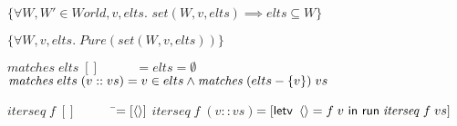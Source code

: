 \documentclass[preprint,natbib]{sigplanconf}
\begin{document}
{\begin{specification}
$\{\forall W, W' \in World, v, elts.$ \nextline
\>$set(W, v, elts) \implies elts \subseteq W\}$ \specand \nextline[0.5em]

$\{\forall W, v, elts.\; \mathit{Pure}(set(W,v,elts))\}$ \nextline[0.5em]
  

$\mathit{matches}\;elts\;[] \qquad\;\;\; = elts = \emptyset$ \nextline
$\mathit{matches}\;elts\;(v :: vs) = v \in elts \land \mathit{matches}\;(elts - \{{v}\})\;vs$ \nextline[0.5em]

$\mathit{iterseq}\; f\; [] \qquad\;\;\;\;$\=$= [\left<\right>]$ \nextline
$\mathit{iterseq}\; f\; (v :: vs)$\>$= [\mbox{\textsf{{letv }}}\left<\right> = f\;v\mbox{\textsf{{ in }}}\mbox{\textsf{{run}}}\;\mathit{iterseq}\;f\;vs]$ 
\end{specification}
}
\end{document}
